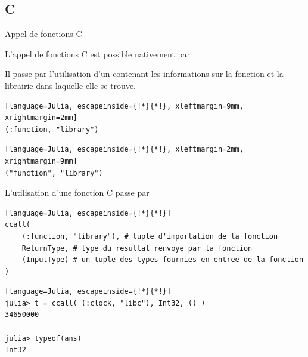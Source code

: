 \subsection{C}
\begin{frame}[containsverbatim]{Appel de fonctions C}
\par{L'appel de fonctions C est possible nativement par {\Julia}.}
\par{Il passe par l'utilisation d'un  contenant les informations sur la fonction et la librairie dans laquelle elle se trouve.}
\vspace{-2ex}
\begin{multicols}{2}
\begin{lstlisting}[language=Julia, escapeinside={!*}{*!}, xleftmargin=9mm, xrightmargin=2mm]
(:function, "library")
\end{lstlisting}
\columnbreak
\begin{lstlisting}[language=Julia, escapeinside={!*}{*!}, xleftmargin=2mm, xrightmargin=9mm]
("function", "library")
\end{lstlisting}
\end{multicols}
\vspace{-2ex}
\par{L'utilisation d'une fonction C passe par }
\begin{lstlisting}[language=Julia, escapeinside={!*}{*!}]
ccall(
    (:function, "library"), # tuple d'importation de la fonction
    ReturnType, # type du resultat renvoye par la fonction
    (InputType) # un tuple des types fournies en entree de la fonction
)
\end{lstlisting}
\vspace{-2ex}
\begin{lstlisting}[language=Julia, escapeinside={!*}{*!}]
julia> t = ccall( (:clock, "libc"), Int32, () )
34650000

julia> typeof(ans)
Int32
\end{lstlisting}
\end{frame}


